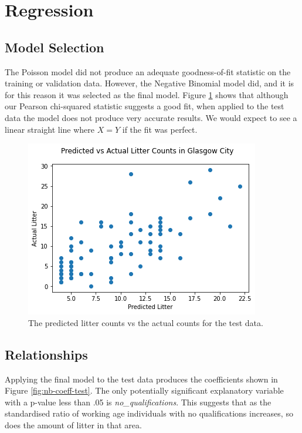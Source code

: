 \documentclass{thesis}
\begin{document}
\section{Regression}

\subsection{Model Selection}

The Poisson model did not produce an adequate goodness-of-fit statistic on the training or validation data. However, the Negative Binomial model did, and it is for this reason it was selected as the final model. Figure \ref{fig:predicted-vs-actual-test} shows that although our Pearson chi-squared statistic suggests a good fit, when applied to the test data the model does not produce very accurate results. We would expect to see a linear straight line where $X = Y$ if the fit was perfect.

\begin{figure}[h]
    \centering
    \includegraphics[scale=0.6]{images/predicted-vs-actual-test.png}
    \caption{The predicted litter counts vs the actual counts for the test data.}
    \label{fig:predicted-vs-actual-test}
\end{figure}

\subsection{Relationships}

Applying the final model to the test data produces the coefficients shown in Figure \ref{fig:nb-coeff-test}. The only potentially significant explanatory variable with a p-value less than .05 is \textit{no\_qualifications}. This suggests that as the standardised ratio of working age individuals with no qualifications increases, so does the amount of litter in that area.
\end{document}
